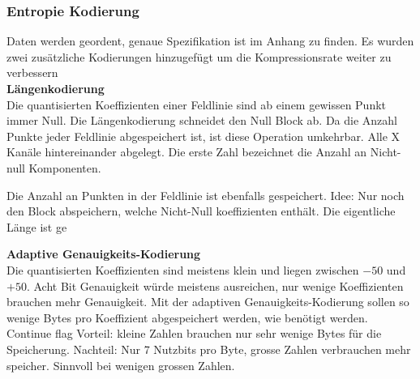 \subsubsection{Entropie Kodierung}\label{konzept:loesung1:kodierung}
Daten werden geordent, genaue Spezifikation ist im Anhang zu finden.
Es wurden zwei zusätzliche Kodierungen hinzugefügt um die Kompressionsrate weiter zu verbessern\\

\textbf{Längenkodierung}\\
Die quantisierten Koeffizienten einer Feldlinie sind ab einem gewissen Punkt immer  Null. Die Längenkodierung schneidet den Null Block ab. Da die Anzahl Punkte jeder Feldlinie abgespeichert ist, ist diese Operation umkehrbar. Alle X Kanäle hintereinander abgelegt. Die erste Zahl bezeichnet die Anzahl an Nicht-null Komponenten.

Die Anzahl an Punkten in der Feldlinie ist ebenfalls gespeichert. Idee: Nur noch den Block abspeichern, welche Nicht-Null koeffizienten enthält. Die eigentliche Länge ist ge

\textbf{Adaptive Genauigkeits-Kodierung}\\
Die quantisierten Koeffizienten sind meistens klein und liegen zwischen $-50$ und $+50$. Acht Bit Genauigkeit würde meistens ausreichen, nur wenige Koeffizienten brauchen mehr Genauigkeit. Mit der adaptiven Genauigkeits-Kodierung sollen so wenige Bytes pro Koeffizient abgespeichert werden, wie benötigt werden. 
Continue flag
Vorteil: kleine Zahlen brauchen nur sehr wenige Bytes für die Speicherung. Nachteil: Nur 7 Nutzbits pro Byte, grosse Zahlen verbrauchen mehr speicher. Sinnvoll bei wenigen grossen Zahlen.
